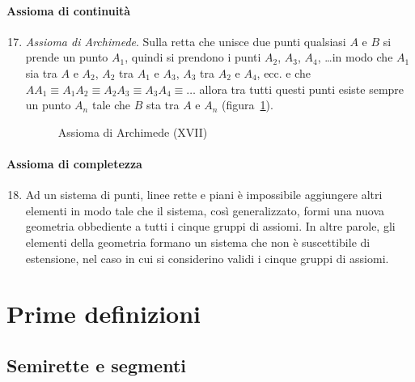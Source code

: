 \paragraph{Assioma di continuità}

\begin{enumerate}[label=\Roman{*}.]
\setcounter{enumi}{16}
\item \emph{Assioma di Archimede}. Sulla retta che unisce due punti qualsiasi $A$ e $B$ si prende un punto $A_1$, quindi si prendono i punti $A_2$, $A_3$, $A_4$, \ldots in modo che $A_1$ sia tra $A$ e $A_2$, $A_2$ tra $A_1$ e $A_3$, $A_3$ tra $A_2$ e $A_4$, ecc. e che  $AA_1\equiv A_1A_2\equiv A_2A_3\equiv A_3A_4\equiv\ldots$ allora tra tutti questi punti esiste sempre un punto $A_n$ tale che $B$ sta tra $A$ e $A_n$ (figura~\ref{fig:1.11}).
\begin{figure}[b,t,h]
 \centering 
 \caption{Assioma di Archimede (XVII)}\label{fig:1.11}
\end{figure}
\end{enumerate}

\paragraph{Assioma di completezza}

\begin{enumerate}[label=\Roman{*}.]
\setcounter{enumi}{17}
\item Ad un sistema di punti, linee rette e piani è impossibile aggiungere altri elementi in modo tale che il sistema, così generalizzato, formi una nuova geometria obbediente a tutti i cinque gruppi di assiomi. In altre parole, gli elementi della geometria formano un sistema che non è suscettibile di estensione, nel caso in cui si considerino validi i cinque gruppi di assiomi.
\end{enumerate}

\vspazio\ovalbox{\risolvii \ref{ese:1.33}, \ref{ese:1.34}, \ref{ese:1.36}, \ref{ese:1.37}, \ref{ese:1.38}, \ref{ese:1.39}, \ref{ese:1.40}, \ref{ese:1.41}, \ref{ese:1.42}}


\section{Prime definizioni}\label{sect:prime_definizioni}

\subsection{Semirette e segmenti}

